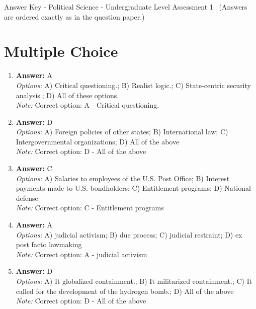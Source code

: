\documentclass[12pt]{article}
\begin{document}
\begin{center}
Answer Key - Political Science - Undergraduate Level Assessment 1 \
\small (Answers are ordered exactly as in the question paper.)
\end{center}

\section*{Multiple Choice}
\begin{enumerate}[label=\arabic*.]
\item \textbf{Answer:} A
\\ \textit{Options:} A) Critical questioning.; B) Realist logic.; C) State-centric security analysis.; D) All of these options.
\\ \textit{Note:} Correct option: A - Critical questioning.
\item \textbf{Answer:} D
\\ \textit{Options:} A) Foreign policies of other states; B) International law; C) Intergovernmental organizations; D) All of the above
\\ \textit{Note:} Correct option: D - All of the above
\item \textbf{Answer:} C
\\ \textit{Options:} A) Salaries to employees of the U.S. Post Office; B) Interest payments made to U.S. bondholders; C) Entitlement programs; D) National defense
\\ \textit{Note:} Correct option: C - Entitlement programs
\item \textbf{Answer:} A
\\ \textit{Options:} A) judicial activism; B) due process; C) judicial restraint; D) ex post facto lawmaking
\\ \textit{Note:} Correct option: A - judicial activism
\item \textbf{Answer:} D
\\ \textit{Options:} A) It globalized containment.; B) It militarized containment.; C) It called for the development of the hydrogen bomb.; D) All of the above
\\ \textit{Note:} Correct option: D - All of the above
\end{enumerate}
\end{document}
